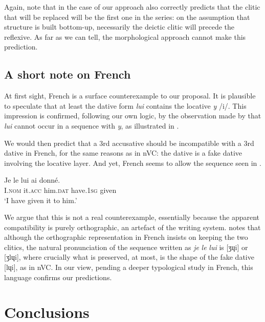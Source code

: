 \documentclass[output=paper,modfonts,nonflat,newtxmath,colorlinks,citecolor=brown]{langsci/langscibook}
\begin{document}
Again, note that in the case of  our approach also correctly predicts that the clitic that will be replaced will be the first one in the series: on the assumption that structure is built bottom-up, necessarily the deictic clitic will precede the reflexive. As far as we can tell, the morphological approach cannot make this prediction.

\subsection{A short note on French} %
\label{sec:cabre:3.3}

At first sight, French is a surface counterexample to our proposal. It is plausible to speculate that at least the dative form \textit{lui} contains the locative \textit{y} /i/. This impression is confirmed, following our own logic, by the observation made by \citet{Rezac2010} that \textit{lui} cannot occur in a sequence with \textit{y}, as illustrated in .

 \z

We would then predict that a 3rd accusative should be incompatible with a 3rd dative in French, for the same reasons as in nVC: the dative is a fake dative involving the locative layer. And yet, French seems to allow the sequence seen in .

\ea%
    \label{ex:cabre:30}
    \gll Je le     lui    ai     donné.\\
         I.\textsc{nom} it.\textsc{acc} him.\textsc{dat}   have.\textsc{1sg} given\\
    \glt `I have given it to him.'
    \z

We argue that this is not a real counterexample, essentially because the apparent compatibility is purely orthographic, an artefact of the writing system. \citet{Schwarze2001} notes that although the orthographic representation in French insists on keeping the two clitics, the natural pronunciation of the sequence written as \textit{je} \textit{le} \textit{lui} is [ʒɥi] or [ʒlɥi], where crucially what is preserved, at most, is the shape of the fake dative [lɥi], as in nVC. In our view, pending a deeper typological study in French, this language confirms our predictions.

\section{Conclusions} %
\label{sec:cabre:4}
\end{document}
